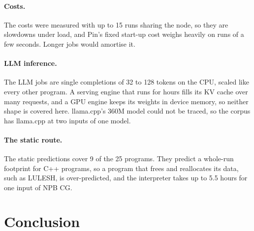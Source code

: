 \documentclass[11pt]{article}
\begin{document}
\paragraph{Costs.} The costs were measured with up to 15 runs sharing the node, so they are slowdowns under
load, and Pin's fixed start-up cost weighs heavily on runs of a few seconds. Longer jobs would amortise it.

\paragraph{LLM inference.} The LLM jobs are single completions of 32 to 128 tokens on the CPU, scaled like every
other program. A serving engine that runs for hours fills its KV cache over many requests, and a GPU engine keeps
its weights in device memory, so neither shape is covered here. llama.cpp's 360M model could not be traced, so the
corpus has llama.cpp at two inputs of one model.

\paragraph{The static route.} The static predictions cover 9 of the 25 programs. They predict a whole-run
footprint for C++ programs, so a program that frees and reallocates its data, such as LULESH, is over-predicted,
and the interpreter takes up to 5.5 hours for one input of NPB CG.


\section{Conclusion}
\label{sec:conclusion}
\end{document}
